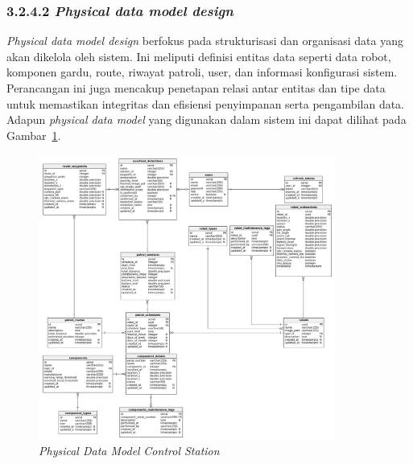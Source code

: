 \subsubsection{3.2.4.2 \emph{Physical data model design}}
\emph{Physical data model design} berfokus pada strukturisasi dan organisasi data yang akan dikelola oleh sistem. Ini meliputi definisi entitas data seperti data robot, komponen gardu, route, riwayat patroli, user, dan informasi konfigurasi sistem. Perancangan ini juga mencakup penetapan relasi antar entitas dan tipe data untuk memastikan integritas dan efisiensi penyimpanan serta pengambilan data. Adapun \emph{physical data model} yang digunakan dalam sistem ini dapat dilihat pada Gambar~\ref{fig:physical-data-model}.

\begin{figure}[H]
  \centering
  \includegraphics[width=0.87\textwidth]{gambar/bab3/pdm.png}
  \caption{\emph{Physical Data Model} \emph{Control Station}}
  \label{fig:physical-data-model}
\end{figure}

